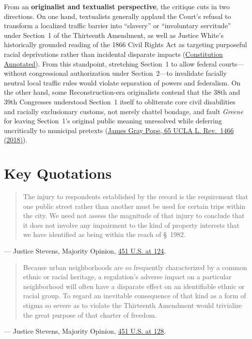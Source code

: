 \documentclass[12pt]{article}
\begin{document}
From an \textbf{originalist and textualist perspective}, the critique cuts in two directions. On one hand, textualists generally applaud the Court's refusal to transform a localized traffic barrier into ``slavery'' or ``involuntary servitude'' under Section~1 of the Thirteenth Amendment, as well as Justice White's historically grounded reading of the 1866 Civil Rights Act as targeting purposeful racial deprivations rather than incidental disparate impacts (\href{https://constitution.congress.gov/browse/essay/amdt13-S2-3/ALDE_00013216/}{Constitution Annotated}). From this standpoint, stretching Section~1 to allow federal courts---without congressional authorization under Section~2---to invalidate facially neutral local traffic rules would violate separation of powers and federalism. On the other hand, some Reconstruction-era originalists contend that the 38th and 39th Congresses understood Section~1 itself to obliterate core civil disabilities and racially exclusionary customs, not merely chattel bondage, and fault \textit{Greene} for leaving Section~1's original public meaning unresolved while deferring uncritically to municipal pretexts (\href{https://www.uclalawreview.org/wp-content/uploads/2019/09/Pope-65.2.pdf}{James Gray Pope, 65 UCLA L. Rev.\ 1466 (2018)}).

\section{Key Quotations}

\begin{quote}
The injury to respondents established by the record is the requirement that one public street rather than another must be used for certain trips within the city. We need not assess the magnitude of that injury to conclude that it does not involve any impairment to the kind of property interests that we have identified as being within the reach of \S~1982.
\end{quote}
\noindent --- Justice Stevens, Majority Opinion, \href{https://supreme.justia.com/cases/federal/us/451/100/}{451 U.S. at 124}.

\begin{quote}
Because urban neighborhoods are so frequently characterized by a common ethnic or racial heritage, a regulation's adverse impact on a particular neighborhood will often have a disparate effect on an identifiable ethnic or racial group. To regard an inevitable consequence of that kind as a form of stigma so severe as to violate the Thirteenth Amendment would trivialize the great purpose of that charter of freedom.
\end{quote}
\noindent --- Justice Stevens, Majority Opinion, \href{https://supreme.justia.com/cases/federal/us/451/100/}{451 U.S. at 128}.
\end{document}

